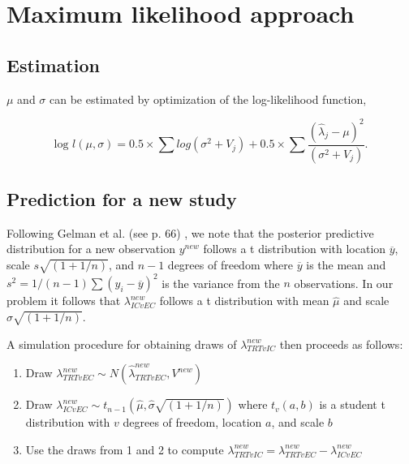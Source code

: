 \documentclass[11pt,final,fleqn]{article}\usepackage[]{graphicx}\usepackage[]{color}
\begin{document}



\appendix
\renewcommand\thefigure{\thesection.\arabic{figure}}    
\setcounter{figure}{0} 

\section{Maximum likelihood approach} \label{appendix:ml}
\subsection{Estimation}
$\mu$ and $\sigma$ can be estimated by optimization of the log-likelihood function,

\begin{equation}
\text{log } l(\mu,\sigma) = 0.5 \times \sum{log(\sigma^2+V_j)} +
0.5 \times \sum{ \frac{(\hat\lambda_j-\mu)^2}{(\sigma^2+V_j)} }.
\end{equation}

\subsection{Prediction for a new study}
Following Gelman et al. (see p. 66) \cite{gelman2013bayesian}, we note that the posterior predictive distribution for a new observation $y^{new}$ follows a t distribution with location $\overline{y}$, scale $s\sqrt{(1 + 1/n)}$, and $n-1$ degrees of freedom where $\overline{y}$ is the mean and $s^2=1/(n-1)\sum (y_i - \overline{y})^2$ is the variance from the $n$ observations. In our problem it follows that $\lambda_{ICvEC}^{new}$ follows a t distribution with mean $\hat{\mu}$ and scale $\hat{\sigma}\sqrt{(1 + 1/n)}$.

A simulation procedure for obtaining draws of $\lambda_{TRTvIC}^{new}$ then proceeds as follows:

\begin{enumerate}
\item Draw $\lambda_{TRTvEC}^{new} \sim N(\hat{\lambda}_{TRTvEC}^{new}, V^{new})$ 

\item Draw $\lambda_{ICvEC}^{new} \sim t_{n-1}(\hat{\mu}, \hat{\sigma}\sqrt{(1 + 1/n)})$ where $t_v(a, b)$ is a student t distribution with $v$ degrees of freedom, location $a$, and scale $b$

\item Use the draws from 1 and 2 to compute $\lambda_{TRTvIC}^{new} =  \lambda_{TRTvEC}^{new} - \lambda_{ICvEC}^{new}$
\end{enumerate}
\end{document}
